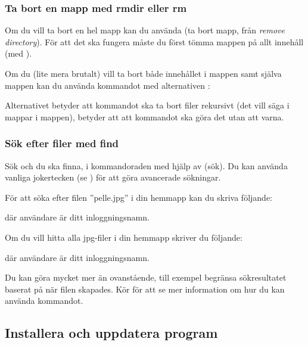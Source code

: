 \documentclass[a4paper,final]{memoir} %
\begin{document}
\subsubsection{Ta bort en mapp med rmdir eller rm}\label{sec:rmdir} 

Om du vill ta bort en hel mapp kan du använda  (ta bort mapp, från \textit{remove directory}). För att det ska fungera måste du först tömma mappen på allt innehåll (med ).


Om du (lite mera brutalt) vill ta bort både innehållet i mappen samt själva mappen kan du använda kommandot  med alternativen :


Alternativet  betyder att kommandot ska ta bort filer rekursivt (det vill säga i mappar i mappen),  betyder att att kommandot ska göra det utan att varna.

\subsubsection{Sök efter filer med find}\label{sec:find} 

Sök och du ska finna, i kommandoraden med hjälp av  (sök). Du kan använda vanliga jokertecken (se ) för att göra avancerade sökningar. 

För att söka efter filen ''pelle.jpg'' i din hemmapp kan du skriva följande:


där användare är ditt inloggningsnamn.

Om du vill hitta alla jpg-filer i din hemmapp skriver du följande:


där användare är ditt inloggningsnamn.

Du kan göra mycket mer än ovanstående, till exempel begränsa sökresultatet baserat på när filen skapades. Kör  för att se mer information om hur du kan använda kommandot.

\subsection{Installera och uppdatera program}
\end{document}
